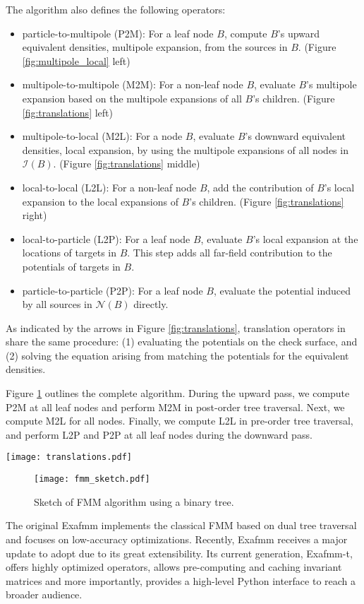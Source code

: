 The algorithm also defines the following operators:
%
\begin{itemize}
    \item particle-to-multipole (P2M): For a leaf node $B$, compute $B$'s upward equivalent densities, \ie multipole expansion, from the sources in $B$. (Figure \ref{fig:multipole_local} left)
    \item multipole-to-multipole (M2M): For a non-leaf node $B$, evaluate $B$'s multipole expansion based on the multipole expansions of all $B$'s children. (Figure \ref{fig:translations} left)
    \item multipole-to-local (M2L): For a node $B$, evaluate $B$'s downward equivalent densities, \ie local expansion, by using the multipole expansions of all nodes in $\mathcal{I}(B)$. (Figure \ref{fig:translations} middle)
    \item local-to-local (L2L): For a non-leaf node $B$, add the contribution of $B$'s local expansion to the local expansions of $B$'s children. (Figure \ref{fig:translations} right)
    \item local-to-particle (L2P): For a leaf node $B$, evaluate $B$'s local expansion at the locations of targets in $B$.
    This step adds all far-field contribution to the potentials of targets in $B$. 
    \item particle-to-particle (P2P): For a leaf node $B$, evaluate the potential induced by all sources in $\mathcal{N}(B)$ directly.
\end{itemize}
%
As indicated by the arrows in Figure \ref{fig:translations}, translation operators in \kifmm share the same procedure: (1) evaluating the potentials on the check surface, and (2) solving the equation arising from matching the potentials for the equivalent densities.

Figure \ref{fig:fmm_sketch} outlines the complete \fmm algorithm.
During the upward pass, we compute P2M at all leaf nodes and perform M2M in post-order tree traversal.
Next, we compute M2L for all nodes.
Finally, we compute L2L in pre-order tree traversal, and perform L2P and P2P at all leaf nodes during the downward pass.

\begin{figure*}
    \centering
    \texttt{[image: translations.pdf]}
    \caption{M2M (left), M2L (middle) and L2L (right) operators in \kifmm. Node $C$ is the parent of $B$, and node $A$ is in the interaction list of $B$.}
    \label{fig:translations}
\end{figure*}

\begin{figure}
    \centering
    \texttt{[image: fmm\_sketch.pdf]}
    \caption{Sketch of FMM algorithm using a binary tree.}
    \label{fig:fmm_sketch}
\end{figure}

The original Exafmm \cite{yokota2012tuned,yokota2013fmm} implements the classical FMM based on dual tree traversal and focuses on low-accuracy optimizations.
Recently, Exafmm receives a major update to adopt \kifmm due to its great extensibility.
Its current generation, Exafmm-t, offers highly optimized \kifmm operators, allows pre-computing and caching invariant matrices and more importantly, provides a high-level Python interface to reach a broader audience.